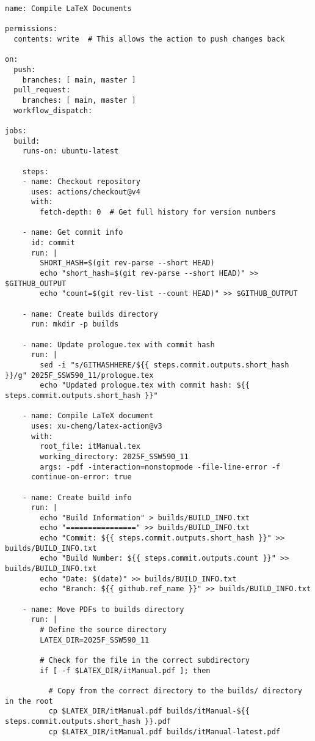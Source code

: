 \begin{verbatim}
name: Compile LaTeX Documents

permissions:
  contents: write  # This allows the action to push changes back

on:
  push:
    branches: [ main, master ]
  pull_request:
    branches: [ main, master ]
  workflow_dispatch:

jobs:
  build:
    runs-on: ubuntu-latest
    
    steps:
    - name: Checkout repository
      uses: actions/checkout@v4
      with:
        fetch-depth: 0  # Get full history for version numbers
    
    - name: Get commit info
      id: commit
      run: |
        SHORT_HASH=$(git rev-parse --short HEAD)
        echo "short_hash=$(git rev-parse --short HEAD)" >> $GITHUB_OUTPUT
        echo "count=$(git rev-list --count HEAD)" >> $GITHUB_OUTPUT
    
    - name: Create builds directory
      run: mkdir -p builds

    - name: Update prologue.tex with commit hash
      run: |
        sed -i "s/GITHASHHERE/${{ steps.commit.outputs.short_hash }}/g" 2025F_SSW590_11/prologue.tex
        echo "Updated prologue.tex with commit hash: ${{ steps.commit.outputs.short_hash }}"

    - name: Compile LaTeX document
      uses: xu-cheng/latex-action@v3
      with:
        root_file: itManual.tex
        working_directory: 2025F_SSW590_11
        args: -pdf -interaction=nonstopmode -file-line-error -f
      continue-on-error: true
    
    - name: Create build info
      run: |
        echo "Build Information" > builds/BUILD_INFO.txt
        echo "================" >> builds/BUILD_INFO.txt
        echo "Commit: ${{ steps.commit.outputs.short_hash }}" >> builds/BUILD_INFO.txt
        echo "Build Number: ${{ steps.commit.outputs.count }}" >> builds/BUILD_INFO.txt
        echo "Date: $(date)" >> builds/BUILD_INFO.txt
        echo "Branch: ${{ github.ref_name }}" >> builds/BUILD_INFO.txt
    
    - name: Move PDFs to builds directory
      run: |
        # Define the source directory
        LATEX_DIR=2025F_SSW590_11
        
        # Check for the file in the correct subdirectory
        if [ -f $LATEX_DIR/itManual.pdf ]; then
          
          # Copy from the correct directory to the builds/ directory in the root
          cp $LATEX_DIR/itManual.pdf builds/itManual-${{ steps.commit.outputs.short_hash }}.pdf
          cp $LATEX_DIR/itManual.pdf builds/itManual-latest.pdf
          

\end{verbatim}
